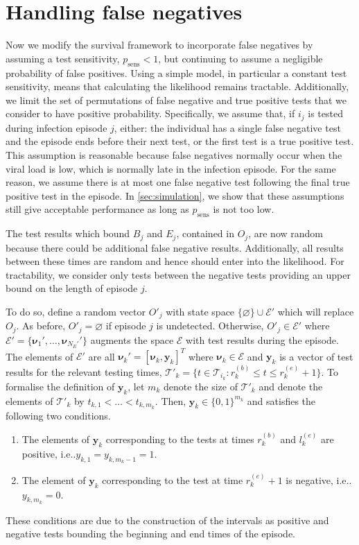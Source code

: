 \documentclass[12pt]{article}
\makeatletter
\newcommand\set{\mathcal}
\renewcommand{\vec}[1]{\bm{#1}}
\newcommand{\ssep}{:}
\newcommand{\psens}{p_\text{sens}}
\newcommand{\sched}{\mathcal{T}}
\DeclareRobustCommand\onedot{\futurelet\@let@token\@onedot}
\def\@onedot{\ifx\@let@token.\else.\null\fi\xspace}
\def\ie{i.e\onedot} \def\Ie{{I.e}\onedot}
\makeatother
\begin{document}
\section{Handling false negatives} \label{sec:false-negatives}

Now we modify the survival framework to incorporate false negatives by assuming a test sensitivity, $\psens < 1$, but continuing to assume a negligible probability of false positives.
Using a simple model, in particular a constant test sensitivity, means that calculating the likelihood remains tractable.
Additionally, we limit the set of permutations of false negative and true positive tests that we consider to have positive probability.
Specifically, we assume that, if $i_j$ is tested during infection episode $j$, either: the individual has a single false negative test and the episode ends before their next test, or the first test is a true positive test.
This assumption is reasonable because false negatives normally occur when the viral load is low, which is normally late in the infection episode.
For the same reason, we assume there is at most one false negative test following the final true positive test in the episode.
In \cref{sec:simulation}, we show that these assumptions still give acceptable performance as long as $\psens$ is not too low.

The test results which bound $B_j$ and $E_j$, contained in $O_j$, are now random because there could be additional false negative results.
Additionally, all results between these times are random and hence should enter into the likelihood.
For tractability, we consider only tests between the negative tests providing an upper bound on the length of episode $j$.

To do so, define a random vector $O'_j$ with state space $\{\varnothing\} \cup \set{E}'$ which will replace $O_j$.
As before, $O'_j = \varnothing$ if episode $j$ is undetected.
Otherwise, $O'_j \in \set{E}'$ where $\set{E}' = \{ \vec{\nu}_1', \dots, \vec{\nu}_{N_E'}' \}$ augments the space $\set{E}$ with test results during the episode.
The elements of $\set{E}'$ are all $\vec{\nu}_k' = [\vec{\nu}_k, \vec{y}_k]^T$ where $\vec{\nu}_k \in \set{E}$ and $\vec{y}_k$ is a vector of test results for the relevant testing times, $\sched'_k = \{ t \in \sched_{i_k} \ssep r_k^{(b)} \leq t \leq r_k^{(e)} + 1 \}$.
To formalise the definition of $\vec{y}_k$, let $m_k$ denote the size of $\sched'_k$ and denote the elements of $\sched'_k$ by $t_{k,1} < \dots < t_{k,m_k}$.
Then, $\vec{y}_k \in \{0, 1\}^{m_k}$ and satisfies the following two conditions.
\begin{enumerate}
  \item The elements of $\vec{y}_k$ corresponding to the tests at times $r_k^{(b)}$ and $l_k^{(e)}$ are positive, \ie $y_{k,1} = y_{k,m_k-1} = 1$.
  \item The element of $\vec{y}_k$ corresponding to the test at time $r_k^{(e)} + 1$ is negative, \ie $y_{k,m_k} = 0$.
\end{enumerate}
These conditions are due to the construction of the intervals as positive and negative tests bounding the beginning and end times of the episode.
\end{document}
